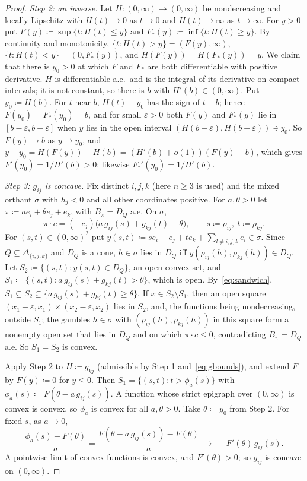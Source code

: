 \documentclass[11pt]{article}
\theoremstyle{plain}
\theoremstyle{definition}
\theoremstyle{remark}
\begin{document}
\begin{proof}
\emph{Step 2: an inverse.} Let $H:(0,\infty)\to(0,\infty)$ be nondecreasing and locally
Lipschitz with $H(t)\to0$ as $t\to0$ and $H(t)\to\infty$ as $t\to\infty$. For $y>0$ put
$F(y)\coloneqq\sup\{t:H(t)\le y\}$ and $F_\ast(y)\coloneqq\inf\{t:H(t)\ge y\}$. By
continuity and monotonicity, $\{t:H(t)>y\}=(F(y),\infty)$, $\{t:H(t)<y\}=(0,F_\ast(y))$,
and $H(F(y))=H(F_\ast(y))=y$. We claim that there is $y_0>0$ at which $F$ and $F_\ast$ are
both differentiable with positive derivative. $H$ is differentiable a.e.\ and is the
integral of its derivative on compact intervals; it is not constant, so there is $b$
with $H'(b)\in(0,\infty)$. Put $y_0\coloneqq H(b)$. For $t$ near $b$, $H(t)-y_0$ has the
sign of $t-b$; hence $F(y_0)=F_\ast(y_0)=b$, and for small $\varepsilon>0$ both $F(y)$ and
$F_\ast(y)$ lie in $[b-\varepsilon,b+\varepsilon]$ when $y$ lies in the open interval
$(H(b-\varepsilon),H(b+\varepsilon))\ni y_0$. So $F(y)\to b$ as $y\to y_0$, and
$y-y_0=H(F(y))-H(b)=(H'(b)+o(1))(F(y)-b)$, which gives $F'(y_0)=1/H'(b)>0$; likewise
$F_\ast'(y_0)=1/H'(b)$.

\emph{Step 3: $g_{ij}$ is concave.} Fix distinct $i,j,k$ (here $n\ge3$ is used) and the
mixed orthant $\sigma$ with $h_j<0$ and all other coordinates positive. For $a,\theta>0$
let $\pi\coloneqq ae_i+\theta e_j+e_k$, with $B_\pi=D_Q$ a.e. On $\sigma$,
\[
  \pi\cdot c=(-c_j)\bigl(a\,g_{ij}(s)+g_{kj}(t)-\theta\bigr),\qquad s\coloneqq\rho_{ij},\
  t\coloneqq\rho_{kj}.
\]
For $(s,t)\in(0,\infty)^2$ put $y(s,t)\coloneqq se_i-e_j+te_k+\sum_{l\ne i,j,k}e_l\in
\sigma$. Since $Q\subseteq\Delta_{\{i,j,k\}}$ and $D_Q$ is a cone, $h\in\sigma$ lies in
$D_Q$ iff $y(\rho_{ij}(h),\rho_{kj}(h))\in D_Q$. Let $S_2\coloneqq\{(s,t):y(s,t)\in D_Q\}$,
an open convex set, and $S_1\coloneqq\{(s,t):a\,g_{ij}(s)+g_{kj}(t)>\theta\}$, which is
open. By~\eqref{eq:sandwich}, $S_1\subseteq S_2\subseteq\{a\,g_{ij}(s)+g_{kj}(t)\ge
\theta\}$. If $x\in S_2\setminus S_1$, then an open square $(x_1-\varepsilon,x_1)\times
(x_2-\varepsilon,x_2)$ lies in $S_2$, and, the functions being nondecreasing, outside
$S_1$; the gambles $h\in\sigma$ with $(\rho_{ij}(h),\rho_{kj}(h))$ in this square form a
nonempty open set that lies in $D_Q$ and on which $\pi\cdot c\le0$, contradicting $B_\pi=
D_Q$ a.e. So $S_1=S_2$ is convex.

Apply Step 2 to $H\coloneqq g_{kj}$ (admissible by Step 1 and~\eqref{eq:gbounds}), and
extend $F$ by $F(y)\coloneqq0$ for $y\le0$. Then $S_1=\{(s,t):t>\phi_a(s)\}$ with
$\phi_a(s)\coloneqq F(\theta-a\,g_{ij}(s))$. A function whose strict epigraph over
$(0,\infty)$ is convex is convex, so $\phi_a$ is convex for all $a,\theta>0$. Take
$\theta\coloneqq y_0$ from Step 2. For fixed $s$, as $a\to0$,
\[
  \frac{\phi_a(s)-F(\theta)}a=\frac{F(\theta-a\,g_{ij}(s))-F(\theta)}a\ \to\
  -F'(\theta)\,g_{ij}(s).
\]
A pointwise limit of convex functions is convex, and $F'(\theta)>0$; so $g_{ij}$ is
concave on $(0,\infty)$.


\end{proof}
\end{document}
